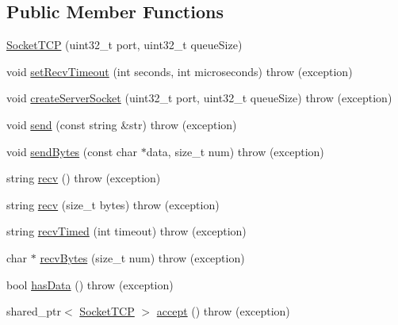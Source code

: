 \subsection*{Public Member Functions}
\begin{DoxyCompactItemize}
\item 
\hyperlink{class_socket_t_c_p_a03fa65da98287c442592f6602087703f}{Socket\-T\-C\-P} (uint32\-\_\-t port, uint32\-\_\-t queue\-Size)
\item 
void \hyperlink{class_socket_t_c_p_a473fa103469c9b83720b4f8ecfde1298}{set\-Recv\-Timeout} (int seconds, int microseconds)  throw (exception)
\item 
void \hyperlink{class_socket_t_c_p_a51b9d8a8c461f357ec72244570c69e5c}{create\-Server\-Socket} (uint32\-\_\-t port, uint32\-\_\-t queue\-Size)  throw (exception)
\item 
void \hyperlink{class_socket_t_c_p_a853ec6fc95a21f49186829a72321cdc8}{send} (const string \&str)  throw (exception)
\item 
void \hyperlink{class_socket_t_c_p_a1e0a19b3511099febd41579d578efd9b}{send\-Bytes} (const char $\ast$data, size\-\_\-t num)  throw (exception)
\item 
string \hyperlink{class_socket_t_c_p_af0fcc6b415f4395f4d45db073f898319}{recv} ()  throw (exception)
\item 
string \hyperlink{class_socket_t_c_p_a8b18cd843ab049c46cba3d6a6d2a0de8}{recv} (size\-\_\-t bytes)  throw (exception)
\item 
string \hyperlink{class_socket_t_c_p_ad0488313f286b1583e300fc39004db97}{recv\-Timed} (int timeout)  throw (exception)
\item 
char $\ast$ \hyperlink{class_socket_t_c_p_a429d26df00424eb1776cce33207b6b47}{recv\-Bytes} (size\-\_\-t num)  throw (exception)
\item 
bool \hyperlink{class_socket_t_c_p_a0ef19d204316995c6e1943f6894f82c3}{has\-Data} ()  throw (exception)
\item 
shared\-\_\-ptr$<$ \hyperlink{class_socket_t_c_p}{Socket\-T\-C\-P} $>$ \hyperlink{class_socket_t_c_p_a4a895bc95518aa10f02d476e88465809}{accept} ()  throw (exception)
\end{DoxyCompactItemize}


